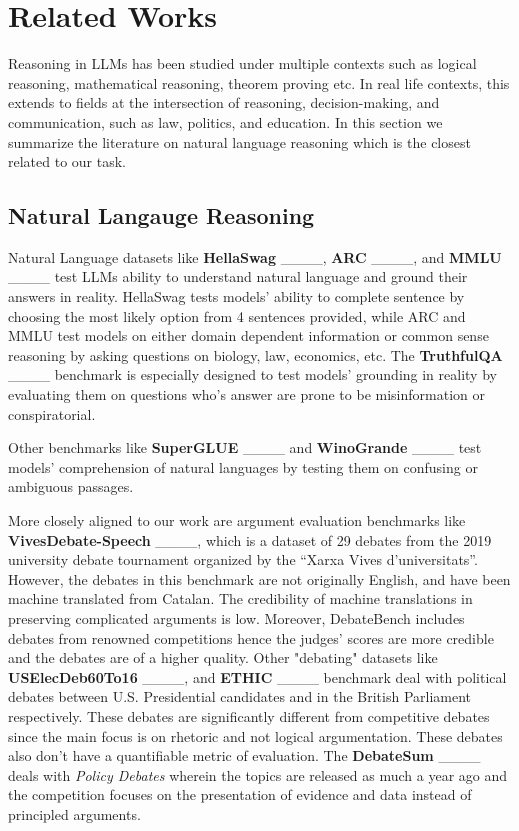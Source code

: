 \section{Related Works}
\label{related}
Reasoning in LLMs has been studied under multiple contexts such as logical reasoning, mathematical reasoning, theorem proving etc. In real life contexts, this extends to fields at the intersection of reasoning, decision-making, and communication, such as law, politics, and education. In this section we summarize the literature on natural language reasoning which is the closest related to our task.

\subsection{Natural Langauge Reasoning}
Natural Language datasets like \textbf{HellaSwag} ____,  \textbf{ARC} ____, and \textbf{MMLU} ____ test LLMs ability to understand natural language and ground their answers in reality. HellaSwag tests models' ability to complete sentence by choosing the most likely option from 4 sentences provided, while ARC and MMLU test models on either domain dependent information or common sense reasoning by asking questions on biology, law, economics, etc. The \textbf{TruthfulQA} ____ benchmark is especially designed to test models' grounding in reality by evaluating them on questions who's answer are prone to be misinformation or conspiratorial. 

Other benchmarks like \textbf{SuperGLUE} ____ and \textbf{WinoGrande} ____ test models' comprehension of natural languages by testing them on confusing or ambiguous passages.

More closely aligned to our work are argument evaluation benchmarks like \textbf{VivesDebate-Speech} ____, which is a dataset of 29 debates from the 2019 university debate tournament organized by the “Xarxa Vives d’universitats”. However, the debates in this benchmark are not originally English, and have been machine translated from Catalan. The credibility of machine translations in preserving complicated arguments is low. Moreover, DebateBench includes debates from renowned competitions hence the judges' scores are more credible and the debates are of a higher quality. Other "debating" datasets like \textbf{USElecDeb60To16} ____, and \textbf{ETHIC} ____ benchmark deal with political debates between U.S. Presidential candidates and in the British Parliament respectively. These debates are significantly different from competitive debates since the main focus is on rhetoric and not logical argumentation. These debates also don't have a quantifiable metric of evaluation. The \textbf{DebateSum} ____ deals with \textit{Policy Debates} wherein the topics are released as much a year ago and the competition focuses on the presentation of evidence and data instead of principled arguments. 

